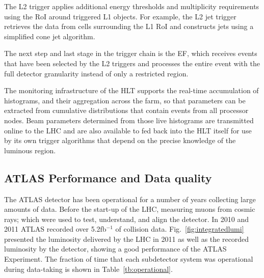 The L2 trigger applies additional energy thresholds and multiplicity requirements using the RoI around triggered L1 objects. For example, the L2 jet trigger retrieves the data from cells surrounding the L1 RoI and constructs jets using a simplified cone jet algorithm. 

The next step and last stage in the trigger chain is the EF, which receives events that have been selected by the L2 triggers and processes the entire event with the full detector granularity instead of only a restricted region. 

The monitoring infrastructure of the HLT supports the real-time accumulation of histograms, and their aggregation across the farm, so that parameters can be extracted from cumulative distributions that contain events from all processor nodes. Beam parameters determined from those live  histograms are transmitted online to the LHC and are also available to fed back into the HLT itself for use by its own trigger algorithms that depend on the precise knowledge of the luminous region. %



 



  



\subsection{ATLAS Performance and Data quality}\label{sec:DQ}

The ATLAS detector has been operational for a number of years collecting large amounts of data. Before the start-up of the LHC,  measuring 
muons from cosmic rays; which were used to test, understand, and align the detector. In 2010 and 2011 ATLAS recorded over 5.2fb$^{-1}$ of collision data. Fig.~\ref{fig:integratedlumi} presented the luminosity delivered by the LHC in 2011 as well as the recorded luminosity by the detector, showing a good performance of the ATLAS Experiment. 
The fraction of time that each subdetector system was operational during data-taking is shown in Table~\ref{tb:operational}.


